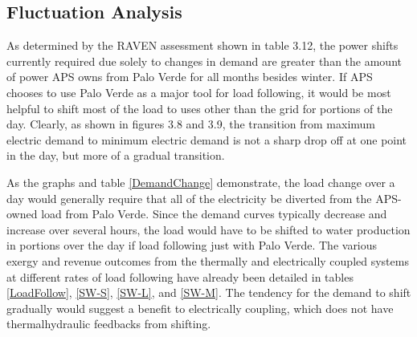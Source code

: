\subsection{Fluctuation Analysis}

As determined by the RAVEN assessment shown in table 3.12, the power shifts currently required due solely to changes in demand are greater than the amount of power APS owns from Palo Verde for all months besides winter.  If APS chooses to use Palo Verde as a major tool for load following, it would be most helpful to shift most of the load to uses other than the grid for portions of the day.  Clearly, as shown in figures 3.8 and 3.9, the transition from maximum electric demand to minimum electric demand is not a sharp drop off at one point in the day, but more of a gradual transition.

As the graphs and table \ref{DemandChange} demonstrate, the load change over a day would generally require that all of the electricity be diverted from the APS-owned load from Palo Verde.  Since the demand curves typically decrease and increase over several hours, the load would have to be shifted to water production in portions over the day if load following just with Palo Verde.  The various exergy and revenue outcomes from the thermally and electrically coupled systems at different rates of load following have already been detailed in tables \ref{LoadFollow}, \ref{SW-S}, \ref{SW-L}, and \ref{SW-M}. The tendency for the demand to shift gradually would suggest a benefit to electrically coupling, which does not have thermalhydraulic feedbacks from shifting.
% 
% 


